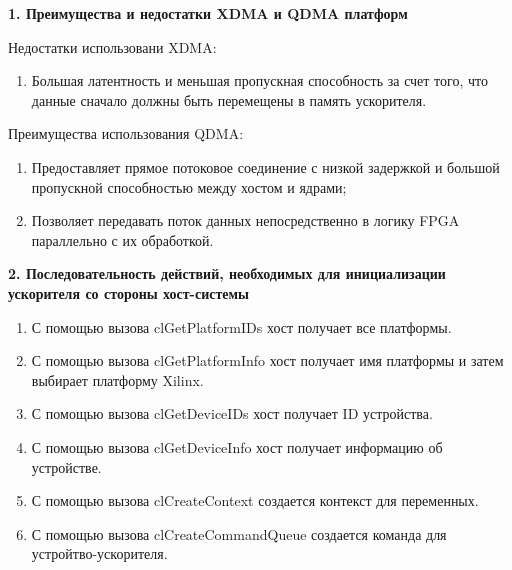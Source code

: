 
\textbf{1. Преимущества и недостатки XDMA и QDMA платформ}


Недостатки использовани XDMA:
\begin{enumerate}
	\item Большая латентность и меньшая пропускная способность за счет того, что данные сначало должны быть перемещены в память ускорителя.
\end{enumerate}

Преимущества использования QDMA:
\begin{enumerate}
	\item Предоставляет прямое потоковое соединение с низкой задержкой и большой пропускной способностью между хостом и ядрами;
	\item Позволяет передавать поток данных непосредственно в логику FPGA параллельно с их обработкой.
\end{enumerate}


\textbf{2. Последовательность действий, необходимых для инициализации ускорителя со стороны хост-системы}

\begin{enumerate}
	\item С помощью вызова clGetPlatformIDs хост получает все платформы.
	\item С помощью вызова clGetPlatformInfo хост получает имя платформы и затем выбирает  платформу Xilinx.
	\item С помощью вызова clGetDeviceIDs хост получает ID устройства.
	\item С помощью вызова clGetDeviceInfo хост получает информацию об устройстве.
	\item С помощью вызова clCreateContext создается контекст для переменных.
	\item С помощью вызова clCreateCommandQueue создается команда для устройтво-ускорителя.
\end{enumerate}

